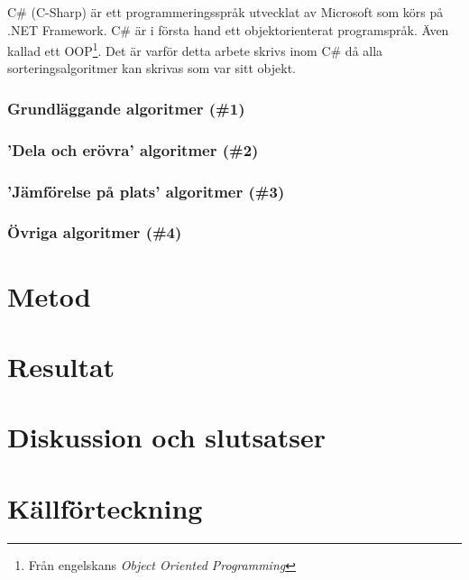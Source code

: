 \documentclass[twocolumn, a4]{article}
\begin{document}
C\# (C-Sharp) är ett programmeringsspråk utvecklat av Microsoft som körs på .NET Framework. \cite{7} C\# är i första hand ett objektorienterat programspråk. Även kallad ett OOP\footnote{Från engelskans \textit{Object Oriented Programming}}. Det är varför detta arbete skrivs inom C\# då alla sorteringsalgoritmer kan skrivas som var sitt objekt.

\subsubsection{Grundläggande algoritmer (\#1)}

\subsubsection{'Dela och erövra' algoritmer (\#2)}

\subsubsection{'Jämförelse på plats' algoritmer (\#3)}

\subsubsection{Övriga algoritmer (\#4)}

\section{Metod}

\section{Resultat}

\section{Diskussion och slutsatser}

\onecolumn
\newpage
\section{Källförteckning}
\printbibliography
\end{document}

